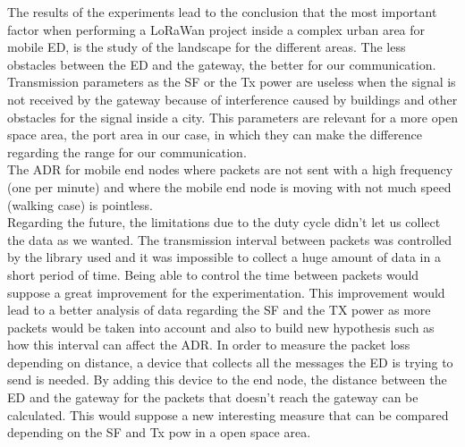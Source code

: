 The results of the experiments lead to the conclusion that the most important factor when performing a LoRaWan project inside a complex urban area for mobile ED, is the study of the landscape for the different areas. 
The less obstacles between the ED and the gateway, the better for our communication.\\
Transmission parameters as the SF or the Tx power are useless when the signal is not received by the gateway because of interference caused by buildings and other obstacles for the signal inside a city. This parameters are relevant for a more open space area, the port area in our case, in which they can make the difference regarding the range for our communication.\\
The ADR for mobile end nodes where packets are not sent with a high frequency (one per minute) and where the mobile end node is moving with not much speed (walking case) is pointless.\\
Regarding the future, the limitations due to the duty cycle didn't let us collect the data as we wanted. The transmission interval between packets was controlled by the library used and it was impossible to collect a huge amount of data in a short period of time. Being able to control the time between packets would suppose a great improvement for the experimentation. This improvement would lead to a better analysis of  data regarding the SF and the TX power as more packets would be taken into account and also to build new hypothesis such as how this interval can affect the ADR. 
In order to measure the packet loss depending on distance, a device that collects all the messages the ED is trying to send is needed. By adding this device to the end node, the distance between the ED and the gateway for the packets that doesn't reach the gateway can be calculated. This would suppose a new interesting measure that can be compared depending on the SF and Tx pow in a open space area.





